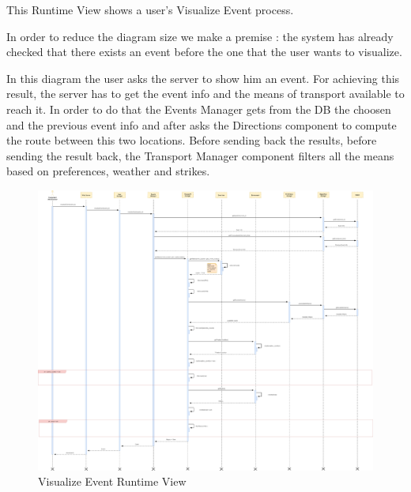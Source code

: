 This Runtime View shows a user's Visualize Event process.\par
In order to reduce the diagram size we make a premise : the system has already checked that there exists an event before the one that the user wants to visualize.\par
In this diagram the user asks the server to show him an event. For achieving this result, the server has to get the event info and the means of transport available to reach it. In order to do that the Events Manager gets from the DB the choosen and the previous event info and after asks the Directions component to compute the route between this two locations. Before sending back the results, before sending the result back, the Transport Manager component filters all the means based on preferences, weather and strikes.
\begin{figure}[H]
	\centering
	\includegraphics[scale=0.125]{Images/Runtime/Visualize_Event}
	\caption{Visualize Event Runtime View}
\end{figure}

